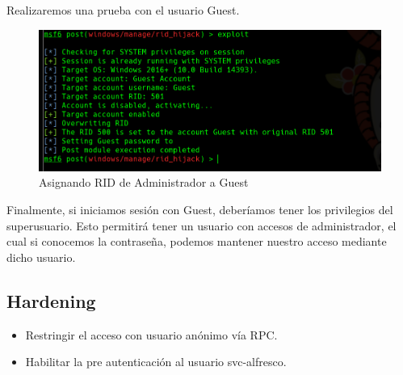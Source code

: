 \documentclass{article}
\begin{document}
Realizaremos una prueba con el usuario Guest.

\begin{figure}[H]
	\center
	\includegraphics[width=\textwidth/2]{images/forest/Gues_como_admin.png}
	\caption{Asignando RID de Administrador a Guest}
\end{figure}

Finalmente, si iniciamos sesión con Guest, deberíamos tener los privilegios del superusuario. Esto permitirá tener un usuario con accesos de administrador, el cual si conocemos la contraseña, podemos mantener nuestro acceso mediante dicho usuario.

\subsection{Hardening}

\begin{itemize}
	\item Restringir el acceso con usuario anónimo vía RPC.
	\item Habilitar la pre autenticación al usuario svc-alfresco.
\end{itemize}
\end{document}
